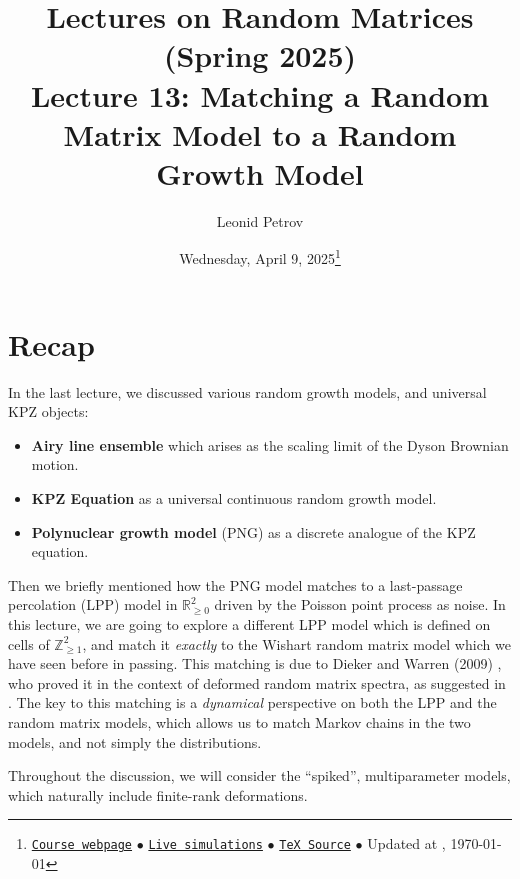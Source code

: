\documentclass[letterpaper,11pt,oneside,reqno]{article}
\numberwithin{equation}{section}
\theoremstyle{definition}
\begin{document}
\title{Lectures on Random Matrices
(Spring 2025)
\\Lecture 13: Matching a Random Matrix Model to a Random Growth Model}


\date{Wednesday, April 9, 2025\footnote{\href{https://lpetrov.cc/rmt25/}{\texttt{Course webpage}}
$\bullet$ \href{https://lpetrov.cc/simulations/model/random-matrices/}{\texttt{Live simulations}}
$\bullet$ \href{https://lpetrov.cc/rmt25/rmt25-notes/rmt2025-l13.tex}{\texttt{TeX Source}}
$\bullet$
Updated at \currenttime, \today}}



\author{Leonid Petrov}


\maketitle

\section{Recap}

In the last lecture, we discussed various random growth models, and universal KPZ objects:
\begin{itemize}
	\item \textbf{Airy line ensemble} which arises as the scaling limit of the Dyson Brownian motion.
	\item \textbf{KPZ Equation} as a universal continuous random growth model.
	\item \textbf{Polynuclear growth model} (PNG) as a discrete analogue of the KPZ equation.
\end{itemize}

Then we briefly mentioned how the PNG model matches to a
last-passage percolation (LPP) model in
$\mathbb{R}^2_{\ge0}$ driven by the Poisson
point process as noise.
In this lecture, we are going to explore a different
LPP model which is defined on cells of $\mathbb{Z}_{\ge1}^{2}$, and
match it \emph{exactly} to the Wishart random matrix model which we have seen before in passing.
This matching is due to Dieker and Warren (2009)
\cite{dieker2008largest}, who proved it
in the context
of deformed random matrix spectra,
as suggested in
\cite{BorodinPeche2009}.
The key to this matching is a \emph{dynamical} perspective
on both the LPP and the random matrix models, which allows us to
match Markov chains in the two models, and not simply the distributions.

Throughout the discussion, we will consider the ``spiked'', multiparameter models,
which naturally include finite-rank deformations.
\end{document}
